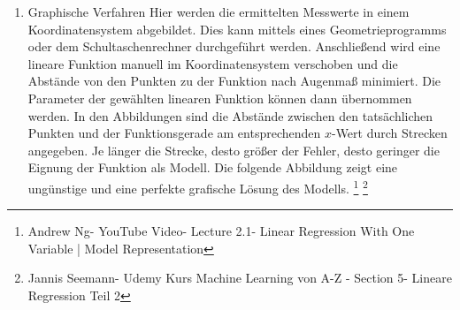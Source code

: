 \documentclass[a4paper]{scrreprt}
\begin{document}
\begin{enumerate}
\item Graphische Verfahren
\newline
Hier werden die ermittelten Messwerte in einem Koordinatensystem abgebildet. Dies kann mittels eines Geometrieprogramms oder dem Schultaschenrechner durchgeführt werden. Anschließend wird eine lineare Funktion manuell im Koordinatensystem verschoben und die Abstände von den Punkten zu der Funktion nach Augenmaß minimiert. Die Parameter der gewählten linearen Funktion können dann übernommen werden. In den Abbildungen sind die Abstände zwischen den tatsächlichen Punkten und der Funktionsgerade am entsprechenden ${x}$-Wert durch Strecken angegeben. Je länger die Strecke, desto größer der Fehler, desto geringer die Eignung der Funktion als Modell. Die folgende Abbildung zeigt eine ungünstige und eine perfekte grafische Lösung des Modells.
\footnote{Andrew Ng- YouTube Video- Lecture 2.1- Linear Regression With One Variable | Model Representation}
\footnote{Jannis Seemann- Udemy Kurs Machine Learning von A-Z - Section 5- Lineare Regression Teil 2}
%
\begin{figure}[htbp]
\centering

\end{figure}
\end{enumerate}
\end{document}
